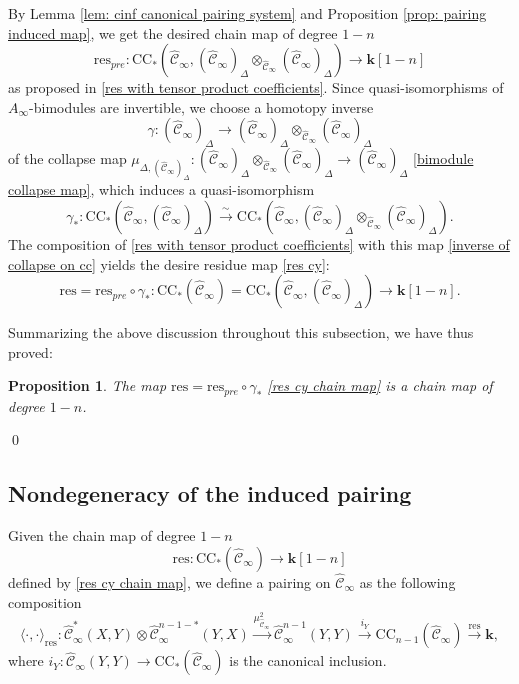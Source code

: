 \documentclass[11pt]{amsproc}
\def\K{{\mathbf{k}}}
\def\cc{\mathcal{C}}
\def\r#1{\mathrm{#1}}
\def\D{\Delta}
\def\ainf{A_\infty}
\def\cinf{\widehat{\cc}_{\infty}}
\newtheorem{prop}[lem]{Proposition}
\theoremstyle{remark}
\numberwithin{equation}{section}
\begin{document}
By Lemma \ref{lem: cinf canonical pairing system} and Proposition \ref{prop: pairing induced map}, we get the desired chain map of degree $1-n$
\[
\r{res}_{pre}: \r{CC}_{*}(\cinf, (\cinf)_{\D} \otimes_{\cinf} (\cinf)_{\D}) \to \K[1-n]
\]
as proposed in \eqref{res with tensor product coefficients}.
Since quasi-isomorphisms of $\ainf$-bimodules are invertible, 
we choose a homotopy inverse 
\begin{equation}\label{inverse of collapse}
\gamma: (\cinf)_{\D} \to (\cinf)_{\D} \otimes_{\cinf} (\cinf)_{\D}
\end{equation}
 of the collapse map $\mu_{\D, (\cinf)_{\D}}: (\cinf)_{\D} \otimes_{\cinf} (\cinf)_{\D} \to (\cinf)_{\D}$ \eqref{bimodule collapse map},
which induces a quasi-isomorphism 
\begin{equation}\label{inverse of collapse on cc}
\gamma_{*}: \r{CC}_{*}(\cinf, (\cinf)_{\D}) \stackrel{\sim}\to \r{CC}_{*}(\cinf, (\cinf)_{\D} \otimes_{\cinf} (\cinf)_{\D}).
\end{equation}
The composition of \eqref{res with tensor product coefficients} with this map \eqref{inverse of collapse on cc} yields the desire residue map \eqref{res cy}:
\begin{equation}\label{res cy chain map}
\r{res} = \r{res}_{pre} \circ \gamma_{*}: \r{CC}_{*}(\cinf) = \r{CC}_{*}(\cinf, (\cinf)_{\D}) \to \K[1-n].
\end{equation}

Summarizing the above discussion throughout this subsection, we have thus proved:

\begin{prop}\label{prop: res cy chain map}
The map $\r{res} = \r{res}_{pre} \circ \gamma_{*}$ \eqref{res cy chain map} is a chain map of degree $1-n$.
\end{prop} \qed

\subsection{Nondegeneracy of the induced pairing}\label{section: pairing nondegenerate}

Given the chain map of degree $1-n$ 
\[
\r{res}: \r{CC}_{*}(\cinf) \to \K[1-n]
\]
defined by \eqref{res cy chain map}, 
we define a pairing on $\cinf$ as the following composition
\begin{equation}\label{cinf res pairing}
\langle \cdot, \cdot \rangle_{\r{res}}: \cinf^{*}(X, Y) \otimes \cinf^{n-1-*}(Y, X) \stackrel{\mu^{2}_{\cinf}}\to \cinf^{n-1}(Y, Y) \stackrel{i_{Y}}\to \r{CC}_{n-1}(\cinf) \stackrel{\r{res}}\to \K,
\end{equation}
where $i_{Y}: \cinf(Y, Y) \to \r{CC}_{*}(\cinf)$ is the canonical inclusion.
\end{document}

